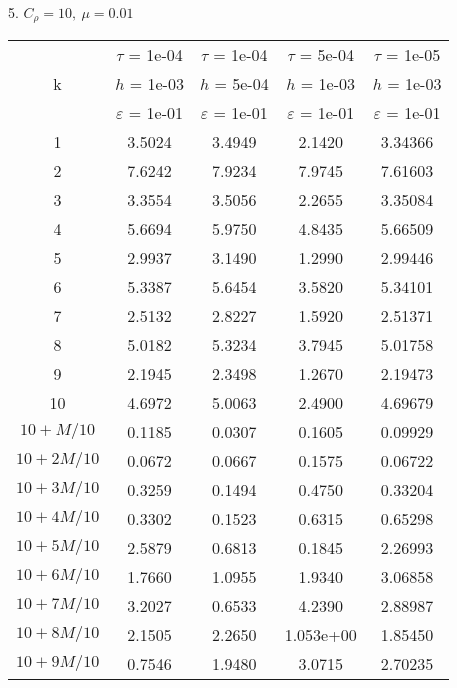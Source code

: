 5. $C_{\rho} = 10, \ \mu = 0.01$
\begin{center}
	\begin{tabular}{ |c|c|c|c|c| } 
		\hline
		& $\tau$ = 1e-04 & $\tau$ = 1e-04 & $\tau$ = 5e-04 & $\tau$ = 1e-05 \\ 
		k & $h$ = 1e-03 & $h$ = 5e-04 & $h$ = 1e-03 & $h$ = 1e-03 \\ 
		& $\varepsilon$ = 1e-01 & $\varepsilon$ = 1e-01 & $\varepsilon$ = 1e-01 & $\varepsilon$ = 1e-01 \\ 
		\hline
		1 & 3.5024 & 3.4949 & 2.1420 & 3.34366 \\
		\hline
		2 & 7.6242 & 7.9234 & 7.9745 & 7.61603 \\
		\hline
		3 & 3.3554 & 3.5056 & 2.2655 & 3.35084 \\
		\hline
		4 & 5.6694 & 5.9750 & 4.8435 & 5.66509 \\
		\hline
		5 & 2.9937 & 3.1490 & 1.2990 & 2.99446 \\
		\hline
		6 & 5.3387 & 5.6454 & 3.5820 & 5.34101 \\
		\hline
		7 & 2.5132 & 2.8227 & 1.5920 & 2.51371 \\
		\hline
		8 & 5.0182 & 5.3234 & 3.7945 & 5.01758 \\
		\hline
		9 & 2.1945 & 2.3498 & 1.2670 & 2.19473 \\
		\hline
		10 & 4.6972 & 5.0063 & 2.4900 & 4.69679 \\
		\hline
		$10 + M/10$ & 0.1185 & 0.0307 & 0.1605 & 0.09929 \\
		\hline
		$10 + 2M/10$ & 0.0672 & 0.0667 & 0.1575 & 0.06722 \\
		\hline
		$10 + 3M/10$ & 0.3259 & 0.1494 & 0.4750 & 0.33204 \\
		\hline
		$10 + 4M/10$ & 0.3302 & 0.1523 & 0.6315 & 0.65298 \\
		\hline
		$10 + 5M/10$ & 2.5879 & 0.6813 & 0.1845 & 2.26993 \\
		\hline
		$10 + 6M/10$ & 1.7660 & 1.0955 & 1.9340 & 3.06858 \\
		\hline
		$10 + 7M/10$ & 3.2027 & 0.6533 & 4.2390 & 2.88987 \\
		\hline
		$10 + 8M/10$ & 2.1505 & 2.2650 & 1.053e+00 & 1.85450 \\
		\hline
		$10 + 9M/10$ & 0.7546 & 1.9480 & 3.0715 & 2.70235 \\
		\hline
	\end{tabular}
\end{center}

